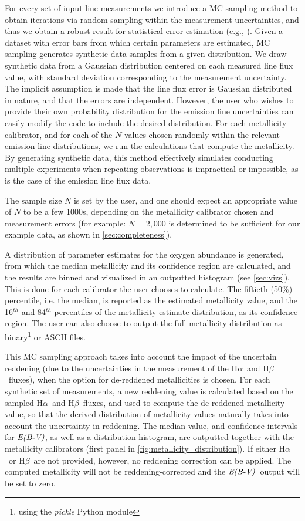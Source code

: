 \documentclass{emulateapj}
\newcommand{\ha}{\ensuremath{\mathrm{H}\alpha}}
\newcommand{\hb}{\ensuremath{\mathrm{H}\beta}}
\newcommand{\ebmv}{\ensuremath{\mathrm{\emph{E(B-V)}}}}
\begin{document}
For every set of input line measurements we introduce a MC sampling
method to obtain iterations via random sampling within the measurement
uncertainties, and thus we obtain a robust result for statistical
error estimation (e.g., \citealt{efron79,hastie09,andrae10}).  Given a
dataset with error bars from which certain parameters are estimated,
MC sampling generates synthetic data samples from a given
distribution. We draw synthetic data from a Gaussian distribution
centered on each measured line flux value, with standard deviation
corresponding to the measurement uncertainty. The implicit assumption
is made that the line flux error is Gaussian distributed in nature,
and that the errors are independent. However, the user who wishes to
provide their own probability distribution for the emission line
uncertainties can easily modify the code to include the desired
distribution.  For each metallicity calibrator, and for each of the
$N$ values chosen randomly within the relevant emission line
distributions, we run the calculations that compute the metallicity.
By generating synthetic data, this method effectively simulates
conducting multiple experiments when repeating observations is
impractical or impossible, as is the case of the emission line flux
data.

The sample size $N$ is set by the user, and one should expect an
appropriate value of $N$ to be a few 1000s, depending on the
metallicity calibrator chosen and measurement errors (for example:
$N=2,000$ is determined to be sufficient for our example data, as
shown in \autoref{sec:completeness}).

A distribution of parameter estimates for the oxygen abundance is
generated, from which the median metallicity and its confidence region
are calculated, and the results are binned and visualized in an
outputted histogram (see \autoref{sec:vizs}). This is done for each
calibrator the user chooses to calculate. The fiftieth (50\%)
percentile, i.e.  the median, is reported as the estimated metallicity
value, and the 16$^{th}$ and 84$^{th}$ percentiles of the metallicity
estimate distribution, as its confidence region. The user can also
choose to output the full metallicity distribution as
binary\footnote{using the \emph{pickle} Python module} or ASCII files.

This MC sampling approach takes into account the impact of the
uncertain reddening (due to the uncertainties in the measurement of
the \ha~and \hb~fluxes), when the option for de-reddened metallicities
is chosen. For each synthetic set of measurements, a new reddening
value is calculated based on the sampled \ha~and \hb~fluxes, and used
to compute the de-reddened metallicity value, so that the derived
distribution of metallicity values naturally takes into account the
uncertainty in reddening. The median value, and confidence intervals
for \ebmv, as well as a distribution histogram, are outputted together
with the metallicity calibrators (first panel in
\autoref{fig:metallicity_distribution}). If either \ha~or \hb~are not
provided, however, no reddening correction can be applied. The
computed metallicity will not be reddening-corrected and the
\ebmv~output will be set to zero.
\end{document}
